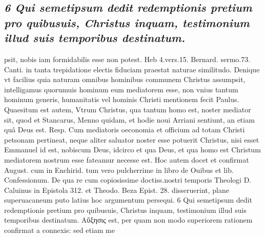 \documentclass{article}
\begin{document}
\begin{pages}
\subsection*{\textit{6 Qui semetipsum dedit redemptionis pretium pro quibusuis, Christus inquam, testimonium illud suis temporibus destinatum.}}psit, nobis iam formidabilis esse non potest. Heb 4.vers.15. Bernard. sermo.73. Canti. in tanta trepidatione electis fiduciam praestat naturae similitudo. Denique vt facilius quia naturam omnibus hominibus communem Christus assumpsit, intelligamus quorumuis hominum eum mediatorem esse, non vnius tantum hominum generis, humanitatis vel hominis Christi mentionem fecit Paulus. Quaesitum est autem, Vtrum Christus, qua tantum homo est, noster mediator sit, quod et Stancarus, Menno quidam, et hodie noui Arriani sentiunt, an etiam quâ Deus est. Resp. Cum mediatoris oeconomia et officium ad totam Christi petsonam pertineat, neque aliter saluator noster esse potuerit Christus, nisi esset Emmanuel id est, nobiscum Deus, idcirco et qua Deus, et qua homo est Christum mediatorem nostrum esse fateamur necesse est. Hoc autem docet et confirmat August. cum in Enchirid. tum vero pulcherrime in libro de Ouibus  et lib.  Confessionum. De qua re cum copiosissime doctiss.nostri temporis Theologi D. Caluinus in Epistola 312. et Theodo. Beza Epist. 28. disseruerint, plane superuacaneum puto latius hoc argumentum persequi. 6 Qui semetipsum dedit redemptionis pretium pro quibusuis, Christus inquam, testimonium illud suis temporibus destinatum. Αὔξησις est, per quam non modo superiorem rationem confirmat a connexis: sed etiam me\pend

\end{pages}
\end{document}
